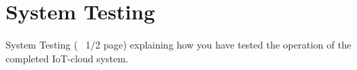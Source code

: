 \section{System Testing}
\label{sec:experiments}

System Testing (~ 1/2 page) explaining how you have tested the operation of the completed IoT-cloud system.